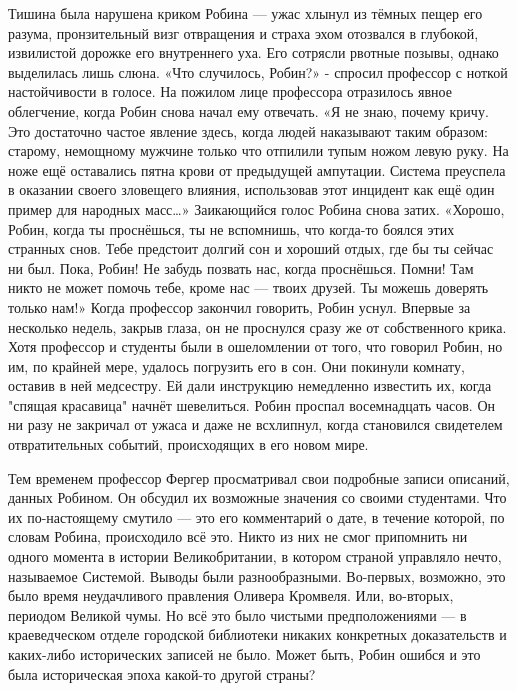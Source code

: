 \documentclass[a4paper,12pt]{book}
\begin{document}
	Тишина была нарушена криком Робина — ужас хлынул из тёмных пещер его разума, пронзительный визг отвращения и страха эхом отозвался в глубокой, извилистой дорожке его внутреннего уха. 
	Его сотрясли рвотные позывы, однако выделилась лишь слюна.
	«Что случилось, Робин?» - спросил профессор с ноткой настойчивости в голосе. На пожилом лице профессора отразилось явное облегчение, когда Робин снова начал ему отвечать.
	«Я не знаю, почему кричу. Это достаточно частое явление здесь, когда людей наказывают таким образом: старому, немощному мужчине только что отпилили тупым ножом левую руку. На ноже ещё оставались пятна крови от предыдущей ампутации. Система преуспела в оказании своего зловещего влияния, использовав этот инцидент как ещё один пример для народных масс…»
	Заикающийся голос Робина снова затих.
	«Хорошо, Робин, когда ты проснёшься, ты не вспомнишь, что когда-то боялся этих странных снов. Тебе предстоит долгий сон и хороший отдых, где бы ты сейчас ни был. Пока, Робин! Не забудь позвать нас, когда проснёшься. Помни! Там никто не может помочь тебе, кроме нас — твоих друзей. Ты можешь доверять только нам!»
	Когда профессор закончил говорить, Робин уснул. Впервые за несколько недель, закрыв глаза, он не проснулся сразу же от собственного крика. Хотя профессор и студенты были в ошеломлении от того, что говорил Робин, но им, по крайней мере, удалось погрузить его в сон.
	Они покинули комнату, оставив в ней медсестру. Ей дали инструкцию немедленно известить их, когда "спящая красавица" начнёт шевелиться.
	Робин проспал восемнадцать часов. Он ни разу не закричал от ужаса и даже не всхлипнул, когда становился свидетелем отвратительных событий, происходящих в его новом мире.

	Тем временем профессор Фергер просматривал свои подробные записи описаний, данных Робином. Он обсудил их возможные значения со своими студентами. Что их по-настоящему смутило — это его комментарий о дате, в течение которой, по словам Робина, происходило всё это. Никто из них не смог припомнить ни одного момента в истории Великобритании, в котором страной управляло нечто, называемое Системой.
	Выводы были разнообразными. Во-первых, возможно, это было время неудачливого правления Оливера Кромвеля. Или, во-вторых, периодом Великой чумы. Но всё это было чистыми предположениями — в краеведческом отделе городской библиотеки никаких конкретных доказательств и каких-либо исторических записей не было. Может быть, Робин ошибся и это была историческая эпоха какой-то другой страны?
\end{document}
